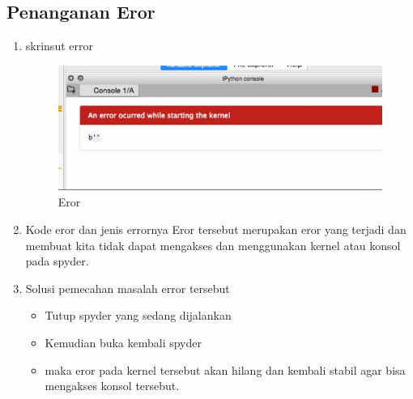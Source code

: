 \subsection{Penanganan Eror}
\begin{enumerate}
\item skrinsut error
\begin{figure}[!htbp]
\centerline{\includegraphics[width=1\textwidth]{figures/c7t/eror.JPG}}
\caption{Eror}
\label{c7t_28}
\end{figure}
\item Kode eror dan jenis errornya
\subitem Eror tersebut merupakan eror yang terjadi dan membuat kita tidak dapat mengakses dan menggunakan kernel atau konsol pada spyder.
\item Solusi pemecahan masalah error tersebut
\begin{itemize}
\item Tutup spyder yang sedang dijalankan
\item Kemudian buka kembali spyder
\item maka eror pada kernel tersebut akan hilang dan kembali stabil agar bisa mengakses konsol tersebut.
\end{itemize}
\end{enumerate}